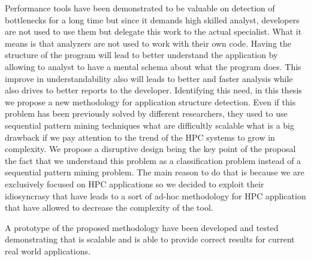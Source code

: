 \documentclass[a4paper,11pt,twoside]{book}
\begin{document}
Performance tools have been demonstrated to be valuable
on detection of bottlenecks for a long time but since it demands high skilled
analyst, developers are not used to use them but delegate this work to the
actual specialist. What it means is that analyzers are not used to work with
their own code. Having the structure of the program will lead to better
understand the application by allowing to analyst to have a mental schema about
what the program does. This improve in understandability also will leads to
better and faster analysis while also drives to better reports to the developer. 
Identifying this need, in this thesis we propose a new methodology for
application structure detection. Even if this problem has been previously solved by
different researchers, they used to use sequential pattern mining techniques
what are difficultly scalable what is a big drawback if we pay attention to the
trend of the HPC systems to grow in complexity.
We propose a disruptive design being the key point of the proposal the fact that we
understand this problem
as a classification problem instead of a sequential pattern mining problem. The main
reason to do that is because we are exclusively focused on HPC applications so
we decided to exploit their idiosyncrasy that have leads to a sort of ad-hoc
methodology for HPC application that have allowed to decrease the complexity of
the tool.

A prototype of the proposed methodology have been developed and tested
demonstrating that is scalable and is able to provide correct results for
current real world applications.



\tableofcontents
\listoffigures

\mainmatter %
\pagestyle{fancy} %



%




\begin{appendices}
    
\end{appendices}



\end{document}
